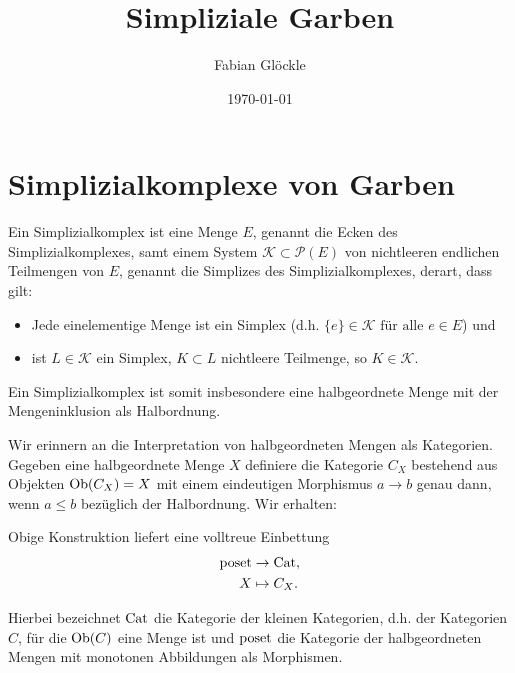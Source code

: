 



\title{Simpliziale Garben}
\author{Fabian Glöckle}
\date{\today}

\chapter{Simplizialkomplexe von Garben}

\begin{defn}
  Ein Simplizialkomplex ist eine Menge $E$, genannt die Ecken des
  Simplizialkomplexes, samt einem System $ \mathcal{K} \subset
  \mathcal{P}(E) $ von nichtleeren endlichen Teilmengen von $E$,
  genannt die Simplizes des Simplizialkomplexes, derart, dass gilt:
  \begin{itemize}
  \item Jede einelementige Menge ist ein Simplex (d.h. $\{e\} \in
    \mathcal{K} \text{ für alle } e \in E$) und
  \item ist $L \in \mathcal{K}$ ein Simplex, $K \subset L$ nichtleere
    Teilmenge, so $K \in \mathcal{K}$.
  \end{itemize}
\end{defn}

Ein Simplizialkomplex ist somit insbesondere eine halbgeordnete Menge
mit der Mengeninklusion als Halbordnung.

Wir erinnern an die Interpretation von halbgeordneten Mengen als
Kategorien. Gegeben eine halbgeordnete Menge $X$ definiere die
Kategorie $C_X$ bestehend aus Objekten $\operatorname{Ob}(C_X) = X$ mit einem
eindeutigen Morphismus $a \to b$ genau dann, wenn $a \leq b$ bezüglich
der Halbordnung. Wir erhalten:

\begin{lemma}
  Obige Konstruktion liefert eine volltreue Einbettung
  \begin{align*}
    \operatorname{poset} &\to \operatorname{Cat}, \\
    X &\mapsto C_X.    
  \end{align*}
\end{lemma}


Hierbei bezeichnet $\operatorname{Cat}$ die Kategorie der kleinen Kategorien,
d.h. der Kategorien $C$, für die $\operatorname{Ob}(C)$ eine Menge ist und $\operatorname{poset}$
die Kategorie der halbgeordneten Mengen mit monotonen Abbildungen als
Morphismen.

